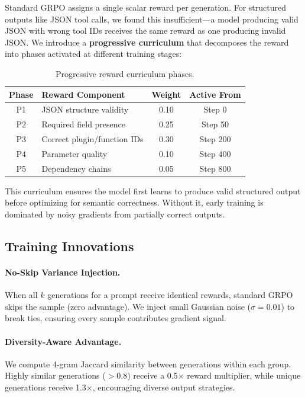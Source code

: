 \documentclass[10pt,twocolumn]{article}
\begin{document}
Standard GRPO \citep{shao2024deepseekmath} assigns a single scalar reward per generation. For structured outputs like JSON tool calls, we found this insufficient---a model producing valid JSON with wrong tool IDs receives the same reward as one producing invalid JSON. We introduce a \textbf{progressive curriculum} that decomposes the reward into phases activated at different training stages:

\begin{table}[!htbp]
\centering
\caption{Progressive reward curriculum phases.}
\label{tab:phases}
\begin{tabular}{clcc}
\toprule
\textbf{Phase} & \textbf{Reward Component} & \textbf{Weight} & \textbf{Active From} \\
\midrule
P1 & JSON structure validity & 0.10 & Step 0 \\
P2 & Required field presence & 0.25 & Step 50 \\
P3 & Correct plugin/function IDs & 0.30 & Step 200 \\
P4 & Parameter quality & 0.10 & Step 400 \\
P5 & Dependency chains & 0.05 & Step 800 \\
\bottomrule
\end{tabular}
\end{table}

This curriculum ensures the model first learns to produce valid structured output before optimizing for semantic correctness. Without it, early training is dominated by noisy gradients from partially correct outputs.

\subsection{Training Innovations}

\paragraph{No-Skip Variance Injection.}
When all $k$ generations for a prompt receive identical rewards, standard GRPO skips the sample (zero advantage). We inject small Gaussian noise ($\sigma=0.01$) to break ties, ensuring every sample contributes gradient signal.

\paragraph{Diversity-Aware Advantage.}
We compute 4-gram Jaccard similarity between generations within each group. Highly similar generations ($>0.8$) receive a 0.5$\times$ reward multiplier, while unique generations receive 1.3$\times$, encouraging diverse output strategies.
\end{document}
